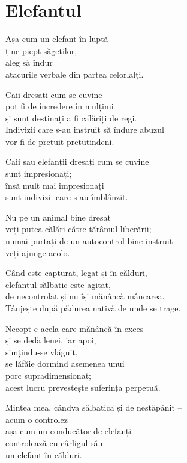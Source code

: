 
\chapter{Elefantul}


Așa cum un elefant în luptă\\
ține piept săgeților,\\
aleg să îndur\\
atacurile verbale din partea celorlalți.


Caii dresați cum se cuvine\\
pot fi de încredere în mulțimi\\
și sunt destinați a fi călăriți de regi.\\
Indivizii care s-au instruit să îndure abuzul\\
vor fi de prețuit pretutindeni.

Caii sau elefanții dresați cum se cuvine\\
sunt impresionați;\\
însă mult mai impresionați\\
sunt indivizii care s-au îmblânzit.


Nu pe un animal bine dresat\\
veți putea călări către tărâmul liberării;\\
numai purtați de un autocontrol bine instruit\\
veți ajunge acolo.


Când este capturat, legat și în călduri,\\
elefantul sălbatic este agitat,\\
de necontrolat și nu își mănâncă mâncarea.\\
Tânjește după pădurea nativă de unde se trage.

Necopt e acela care mănâncă în exces\\
și se dedă lenei, iar apoi,\\
simțindu-se vlăguit,\\
se lăfăie dormind asemenea unui\\
porc supradimensionat;\\
acest lucru prevestește suferința perpetuă.


Mintea mea, cândva sălbatică și de nestăpânit –\\
acum o controlez\\
așa cum un conducător de elefanți\\
controlează cu cârligul său\\
un elefant în călduri.


